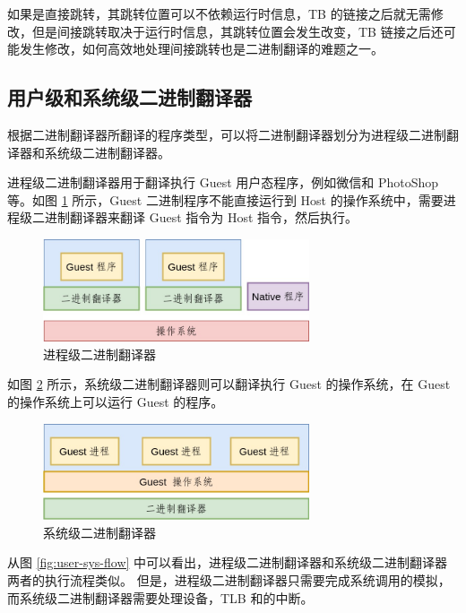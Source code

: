如果是直接跳转，其跳转位置可以不依赖运行时信息，TB 的链接之后就无需修改，但是间接跳转取决于运行时信息，其跳转位置会发生改变，TB 链接之后还可能发生修改，如何高效地处理间接跳转也是二进制翻译的难题之一。

\subsection{用户级和系统级二进制翻译器}
根据二进制翻译器所翻译的程序类型，可以将二进制翻译器划分为进程级二进制翻译器和系统级二进制翻译器。

进程级二进制翻译器用于翻译执行 Guest 用户态程序，例如微信和 PhotoShop 等。如图 \ref{fig:user-mode} 所示，Guest 二进制程序不能直接运行到 Host 的操作系统中，需要进程级二进制翻译器来翻译 Guest 指令为 Host 指令，然后执行。

\begin{figure}[!htbp]
	\centering
	\includegraphics[width=0.7\textwidth]{./images/user-mode.jpg}
	\caption{进程级二进制翻译器}
	\label{fig:user-mode}
\end{figure}

如图 \ref{fig:system-mode} 所示，系统级二进制翻译器则可以翻译执行 Guest 的操作系统，在 Guest 的操作系统上可以运行 Guest 的程序。
\begin{figure}[!htbp]
	\centering
	\includegraphics[width=0.7\textwidth]{./images/system-mode.jpg}
	\caption{系统级二进制翻译器}
	\label{fig:system-mode}
\end{figure}

从图 \ref{fig:user-sys-flow} 中可以看出，进程级二进制翻译器和系统级二进制翻译器两者的执行流程类似。
但是，进程级二进制翻译器只需要完成系统调用的模拟，而系统级二进制翻译器需要处理设备，TLB 和的中断。

